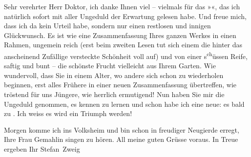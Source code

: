 \pstart{}Sehr verehrter Herr Doktor,\pend\vspace{0.5em}
\pstart
           ich danke Ihnen viel – vielmals für das »\label{K_L03627-2v}\label{K_L03627-2}«, das ich natürlich sofort mit aller Ungeduld der Erwartung
                    gelesen habe. Und freue mich, dass ich da kein Urteil habe, sondern nur einen
                    restlosen und innigen Glückwunsch. Es ist wie eine Zusammenfassung Ihres ganzen
                    Werkes in einen Rahmen, ungemein reich (erst beim zweiten Lesen tut sich einem
                    die hinter das anscheinend Zufällige versteckte Schönheit voll auf) und von
                    einer s\substVorne{}\textsuperscript{ch}\substDazwischen{}ü\substHinten{}ssen Reife, saftig und bunt – die schönste Frucht vielleicht aus {\pb}Ihrem Garten. Wie wundervoll, dass
                    Sie in einem Alter, wo andere sich schon zu wiederholen beginnen, erst alles
                    Frühere in einer neuen Zusammenfassung übertreffen, wie tröstend für uns
                    Jüngere, wie herrlich ermutigend! Nun haben Sie mir die Ungeduld genommen, es
                    kennen zu lernen und schon habe ich eine neue: es bald \label{K_L03627-3v}\label{K_L03627-3} zu \label{T_L03627-1v}\label{T_L03627-1}. Ich weiss es wird ein
                    Triumph werden!\pend
           
\pstart
           Morgen komme ich ins Volksheim und bin schon in freudiger
                    Neugierde erregt, Ihre Frau Gemahlin
                    singen zu hören. All meine guten Grüsse voraus. In Treue ergeben\pend
           \pstart Ihr \spacefill\mbox{Stefan Zweig}\pend{}\endnumbering{}  
      